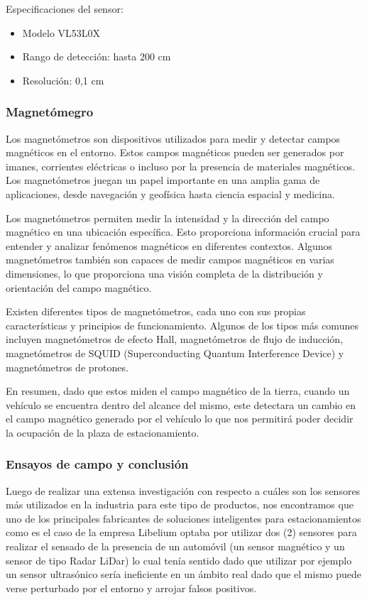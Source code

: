 Especificaciones del sensor:
\begin{itemize}
    \item Modelo VL53L0X
    \item Rango de detección: hasta 200 cm
    \item Resolución: 0,1 cm
\end{itemize}


\subsubsection{Magnetómegro}
Los magnetómetros son dispositivos utilizados para medir y detectar campos magnéticos en el entorno. Estos campos magnéticos pueden ser generados por imanes, corrientes eléctricas o incluso por la presencia de materiales magnéticos. Los magnetómetros juegan un papel importante en una amplia gama de aplicaciones, desde navegación y geofísica hasta ciencia espacial y medicina.

Los magnetómetros permiten medir la intensidad y la dirección del campo magnético en una ubicación específica. Esto proporciona información crucial para entender y analizar fenómenos magnéticos en diferentes contextos. Algunos magnetómetros también son capaces de medir campos magnéticos en varias dimensiones, lo que proporciona una visión completa de la distribución y orientación del campo magnético.

Existen diferentes tipos de magnetómetros, cada uno con sus propias características y principios de funcionamiento. Algunos de los tipos más comunes incluyen magnetómetros de efecto Hall, magnetómetros de flujo de inducción, magnetómetros de SQUID (Superconducting Quantum Interference Device) y magnetómetros de protones.

En resumen, dado que estos miden el campo magnético de la tierra, cuando un vehículo se encuentra dentro del alcance del mismo, este detectara un cambio en el campo magnético generado por el vehículo lo que nos permitirá poder decidir la ocupación de la plaza de estacionamiento.



\subsubsection{Ensayos de campo y conclusión}
Luego de realizar una extensa investigación con respecto a cuáles son los sensores más utilizados en la industria para este tipo de productos, nos encontramos que uno de los principales fabricantes de soluciones inteligentes para estacionamientos como es el caso de la empresa Libelium optaba por utilizar dos (2) sensores para realizar el sensado de la presencia de un automóvil (un sensor magnético y un sensor de tipo Radar LiDar) lo cual tenía sentido dado que utilizar por ejemplo un sensor ultrasónico sería ineficiente en un ámbito real dado que el mismo puede verse perturbado por el entorno y arrojar falsos positivos.

